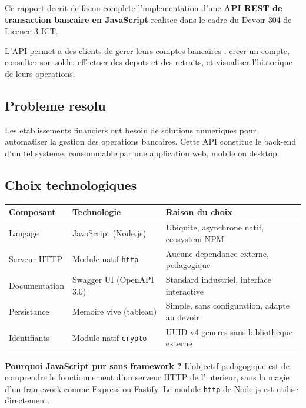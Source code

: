 \documentclass[12pt,a4paper]{article}
\begin{document}
Ce rapport decrit de facon complete l'implementation d'une \textbf{API REST de transaction bancaire en JavaScript} realisee dans le cadre du Devoir 304 de Licence 3 ICT.

L'API permet a des clients de gerer leurs comptes bancaires : creer un compte, consulter son solde, effectuer des depots et des retraits, et visualiser l'historique de leurs operations.

\subsection{Probleme resolu}

Les etablissements financiers ont besoin de solutions numeriques pour automatiser la gestion des operations bancaires. Cette API constitue le back-end d'un tel systeme, consommable par une application web, mobile ou desktop.

\subsection{Choix technologiques}

\begin{center}
\begin{tabular}{lll}
\toprule
\textbf{Composant} & \textbf{Technologie} & \textbf{Raison du choix} \\
\midrule
Langage & JavaScript (Node.js) & Ubiquite, asynchrone natif, ecosystem NPM \\
Serveur HTTP & Module natif \texttt{http} & Aucune dependance externe, pedagogique \\
Documentation & Swagger UI (OpenAPI 3.0) & Standard industriel, interface interactive \\
Persistance & Memoire vive (tableau) & Simple, sans configuration, adapte au devoir \\
Identifiants & Module natif \texttt{crypto} & UUID v4 generes sans bibliotheque externe \\
\bottomrule
\end{tabular}
\end{center}

\begin{infobox}
\textbf{Pourquoi JavaScript pur sans framework ?} L'objectif pedagogique est de comprendre le fonctionnement d'un serveur HTTP de l'interieur, sans la magie d'un framework comme Express ou Fastify. Le module \texttt{http} de Node.js est utilise directement.
\end{infobox}
\end{document}
